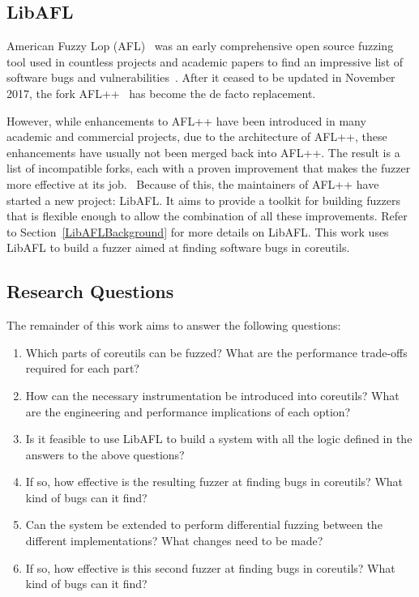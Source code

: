 \documentclass{article}
\let\savedCite=\cite
\renewcommand{\cite}{\unskip~\savedCite}
\begin{document}
\begin{multicols}{2}
    \subsection{LibAFL}
    \label{LibAFLHistory}

    American Fuzzy Lop (AFL)\cite{AFL} was an early comprehensive open source fuzzing tool used in countless projects and academic papers to find an impressive list of software bugs and vulnerabilities\cite{AFLBugs}. After it ceased to be updated in November 2017, the fork AFL++\cite{AFLPlusPlus} has become the de facto replacement.

    However, while enhancements to AFL++ have been introduced in many academic and commercial projects, due to the architecture of AFL++, these enhancements have usually not been merged back into AFL++. The result is a list of incompatible forks, each with a proven improvement that makes the fuzzer more effective at its job.\cite{LibAFL} Because of this, the maintainers of AFL++ have started a new project: LibAFL. It aims to provide a toolkit for building fuzzers that is flexible enough to allow the combination of all these improvements. Refer to Section~\ref{LibAFLBackground} for more details on LibAFL. This work uses LibAFL to build a fuzzer aimed at finding software bugs in coreutils.

    \subsection{Research Questions}
    \label{ResearchQuestions}

    The remainder of this work aims to answer the following questions:

    \begin{enumerate}
        \item Which parts of coreutils can be fuzzed? What are the performance trade-offs required for each part?
        \item How can the necessary instrumentation be introduced into coreutils? What are the engineering and performance implications of each option?
        \item Is it feasible to use LibAFL to build a system with all the logic defined in the answers to the above questions?
        \item If so, how effective is the resulting fuzzer at finding bugs in coreutils? What kind of bugs can it find?
        \item Can the system be extended to perform differential fuzzing between the different implementations? What changes need to be made?
        \item If so, how effective is this second fuzzer at finding bugs in coreutils? What kind of bugs can it find?
    \end{enumerate}


\end{multicols}
\end{document}
